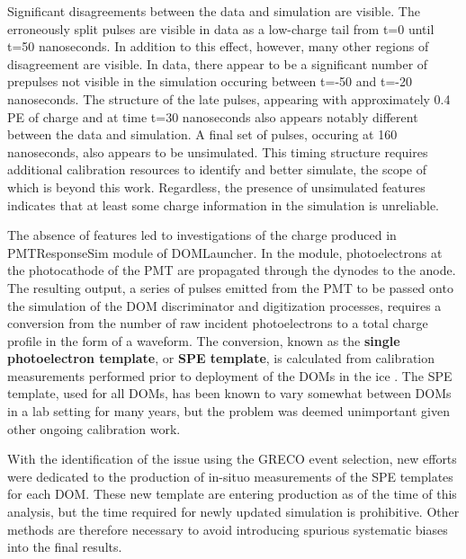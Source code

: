 Significant disagreements between the data and simulation are visible.
The erroneously split pulses are visible in data as a low-charge tail from t=0 until t=50 nanoseconds.
In addition to this effect, however, many other regions of disagreement are visible.
In data, there appear to be a significant number of prepulses not visible in the simulation occuring between t=-50 and t=-20 nanoseconds.
The structure of the late pulses, appearing with approximately 0.4 PE of charge and at time t=30 nanoseconds also appears notably different between the data and simulation.
A final set of pulses, occuring at 160 nanoseconds, also appears to be unsimulated.
This timing structure requires additional calibration resources to identify and better simulate, the scope of which is beyond this work.
Regardless, the presence of unsimulated features indicates that at least some charge information in the simulation is unreliable.

The absence of features led to investigations of the charge produced in PMTResponseSim module of DOMLauncher.
In the module, photoelectrons at the photocathode of the PMT are propagated through the dynodes to the anode.
The resulting output, a series of pulses emitted from the PMT to be passed onto the simulation of the DOM discriminator and digitization processes, requires a conversion from the number of raw incident photoelectrons to a total charge profile in the form of a waveform.
The conversion, known as the \textbf{single photoelectron template}, or \textbf{SPE template}, is calculated from calibration measurements performed prior to deployment of the DOMs in the ice .
The SPE template, used for all DOMs, has been known to vary somewhat between DOMs in a lab setting for many years, but the problem was deemed unimportant given other ongoing calibration work.

With the identification of the issue using the GRECO event selection, new efforts were dedicated to the production of in-situo measurements of the SPE templates for each DOM.
These new template are entering production as of the time of this analysis, but the time required for newly updated simulation is prohibitive.
Other methods are therefore necessary to avoid introducing spurious systematic biases into the final results.

